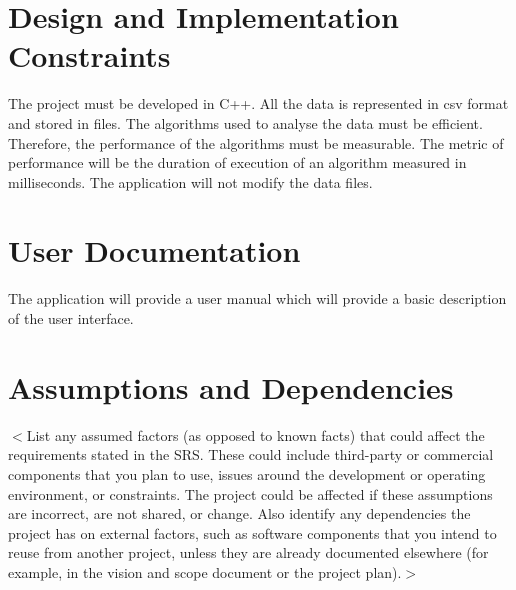 \documentclass{report}
\begin{document}

\section{Design and Implementation Constraints}
The project must be developed in C++.
All the data is represented in csv format and stored in files.
The algorithms used to analyse the data must be efficient. Therefore, the
performance of the algorithms must be measurable. The metric of performance
will be the duration of execution of an algorithm measured in milliseconds.
The application will not modify the data files.


\section{User Documentation}
The application will provide a user manual which will provide a basic
description of the user interface.


\section{Assumptions and Dependencies}

$<$List any assumed factors (as opposed to known facts) that could affect the
requirements stated in the SRS. These could include third-party or commercial
components that you plan to use, issues around the development or operating
environment, or constraints. The project could be affected if these assumptions
are incorrect, are not shared, or change. Also identify any dependencies the
project has on external factors, such as software components that you intend to
reuse from another project, unless they are already documented elsewhere (for
example, in the vision and scope document or the project plan).$>$
\end{document}
